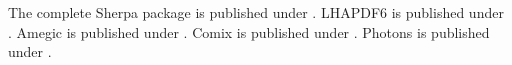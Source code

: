 \documentclass{article}
\begin{document}
The complete Sherpa package is published under \cite{Gleisberg:2008ta}.
LHAPDF6 is published under \cite{Buckley:2014ana}.
Amegic is published under \cite{Krauss:2001iv}.
Comix is published under \cite{Gleisberg:2008fv}.
Photons is published under \cite{Schonherr:2008av}.
\end{document}
